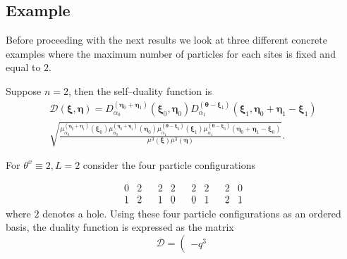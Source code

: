 \documentclass{ximera}
\begin{document}
\subsection{Example}
Before proceeding with the next results we look at three different concrete examples where the maximum number of particles for each sites is fixed and equal to $2$.
 \begin{example} Suppose $n=2$, then the self--duality function is 
\begin{multline*}
     \mathcal{D}(\boldsymbol\xi, \boldsymbol\eta)=D_{\alpha_{0}}^{\left(\boldsymbol\eta_{0}+\boldsymbol\eta_{1}\right)}\left(\boldsymbol\xi_{0}, \boldsymbol\eta_{0}\right)  D_{\alpha_{1}}^{\left(\boldsymbol\theta-\boldsymbol\xi_{1}\right)}\left(\boldsymbol\xi_{1}, \boldsymbol\eta_{0}+\boldsymbol\eta_{1}-\boldsymbol\xi_{1}\right)\\ \sqrt{\frac{\mu^{(\boldsymbol\eta_0+\boldsymbol\eta_1)}_{\alpha_0}(\boldsymbol\xi_0)\mu^{(\boldsymbol\eta_0+\boldsymbol\eta_1)}_{\alpha_0}(\boldsymbol\eta_0)\mu^{(\boldsymbol\theta-\boldsymbol\xi_0)}_{\alpha_1}(\boldsymbol\xi_1)\mu^{(\boldsymbol\theta-\boldsymbol\xi_0)}_{\alpha_1}(\boldsymbol\eta_0+\boldsymbol\eta_1-\boldsymbol\xi_0)}{\mu^3(\boldsymbol\xi) \mu^3(\boldsymbol\eta)}}.
\end{multline*}
   

 
For $\theta^x\equiv 2,L=2$ consider the 
four particle configurations



$$
\begin{array}{llllllllllll}0 & 2 & & 2 & 2 & &  2 & 2 & & 2 & 0 \\ \underline{1} & \underline{2} && \underline{1} & \underline{0} && \underline{0} & \underline{1} && \underline{2} & \underline{1}\end{array}
$$
where $2$ denotes a hole.
Using these 
four particle configurations as an ordered basis, the duality 
function is expressed as the matrix
\scriptsize
\begin{equation*}
 \mathcal{D}=   \left( \begin{array}{cccc}-q^{3}


\end{array}
\end{equation*}
\end{example}
\end{document}
